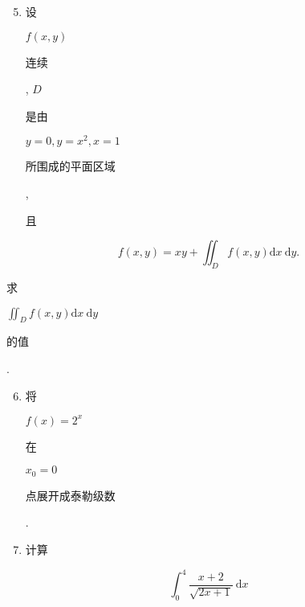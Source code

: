 \documentclass[10pt]{article}
\begin{document}
\begin{enumerate}
  \setcounter{enumi}{4}
  \item \begin{CJK}{UTF8}{mj}设\end{CJK} $f(x, y)$ \begin{CJK}{UTF8}{mj}连续\end{CJK}, $D$ \begin{CJK}{UTF8}{mj}是由\end{CJK} $y=0, y=x^{2}, x=1$ \begin{CJK}{UTF8}{mj}所围成的平面区域\end{CJK}, \begin{CJK}{UTF8}{mj}且\end{CJK}
\end{enumerate}
$$
f(x, y)=x y+\iint_{D} f(x, y) \mathrm{d} x \mathrm{~d} y .
$$
\begin{CJK}{UTF8}{mj}求\end{CJK} $\iint_{D} f(x, y) \mathrm{d} x \mathrm{~d} y$ \begin{CJK}{UTF8}{mj}的值\end{CJK}.

\begin{enumerate}
  \setcounter{enumi}{5}
  \item \begin{CJK}{UTF8}{mj}将\end{CJK} $f(x)=2^{x}$ \begin{CJK}{UTF8}{mj}在\end{CJK} $x_{0}=0$ \begin{CJK}{UTF8}{mj}点展开成泰勒级数\end{CJK}.

  \item \begin{CJK}{UTF8}{mj}计算\end{CJK}

\end{enumerate}
$$
\int_{0}^{4} \frac{x+2}{\sqrt{2 x+1}} \mathrm{~d} x
$$
\end{document}

